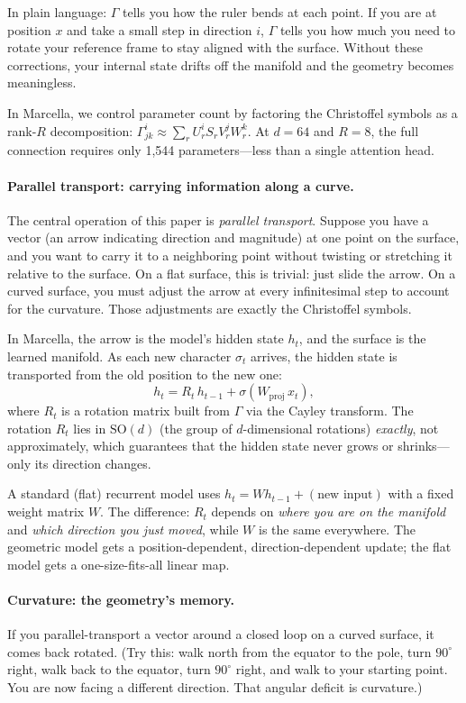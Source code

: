 \documentclass[11pt,a4paper]{article}
\theoremstyle{definition}
\theoremstyle{remark}
\begin{document}
In plain language: $\Gamma$ tells you how the ruler bends at each point. If you are at position $x$ and take a small step in direction $i$, $\Gamma$ tells you how much you need to rotate your reference frame to stay aligned with the surface. Without these corrections, your internal state drifts off the manifold and the geometry becomes meaningless.

In Marcella, we control parameter count by factoring the Christoffel symbols as a rank-$R$ decomposition: $\Gamma^i_{jk} \approx \sum_r U^i_r S_r V^j_r W^k_r$. At $d = 64$ and $R = 8$, the full connection requires only 1,544 parameters---less than a single attention head.

\paragraph{Parallel transport: carrying information along a curve.}
The central operation of this paper is \emph{parallel transport}. Suppose you have a vector (an arrow indicating direction and magnitude) at one point on the surface, and you want to carry it to a neighboring point without twisting or stretching it relative to the surface. On a flat surface, this is trivial: just slide the arrow. On a curved surface, you must adjust the arrow at every infinitesimal step to account for the curvature. Those adjustments are exactly the Christoffel symbols.

In Marcella, the arrow is the model's hidden state $h_t$, and the surface is the learned manifold. As each new character $\sigma_t$ arrives, the hidden state is transported from the old position to the new one:
\[
    h_t = R_t\,h_{t-1} + \sigma(W_{\mathrm{proj}}\,x_t),
\]
where $R_t$ is a rotation matrix built from $\Gamma$ via the Cayley transform. The rotation $R_t$ lies in $\mathrm{SO}(d)$ (the group of $d$-dimensional rotations) \emph{exactly}, not approximately, which guarantees that the hidden state never grows or shrinks---only its direction changes.

A standard (flat) recurrent model uses $h_t = W h_{t-1} + (\text{new input})$ with a fixed weight matrix $W$. The difference: $R_t$ depends on \emph{where you are on the manifold} and \emph{which direction you just moved}, while $W$ is the same everywhere. The geometric model gets a position-dependent, direction-dependent update; the flat model gets a one-size-fits-all linear map.

\paragraph{Curvature: the geometry's memory.}
If you parallel-transport a vector around a closed loop on a curved surface, it comes back rotated. (Try this: walk north from the equator to the pole, turn $90^\circ$ right, walk back to the equator, turn $90^\circ$ right, and walk to your starting point. You are now facing a different direction. That angular deficit is curvature.)
\end{document}
